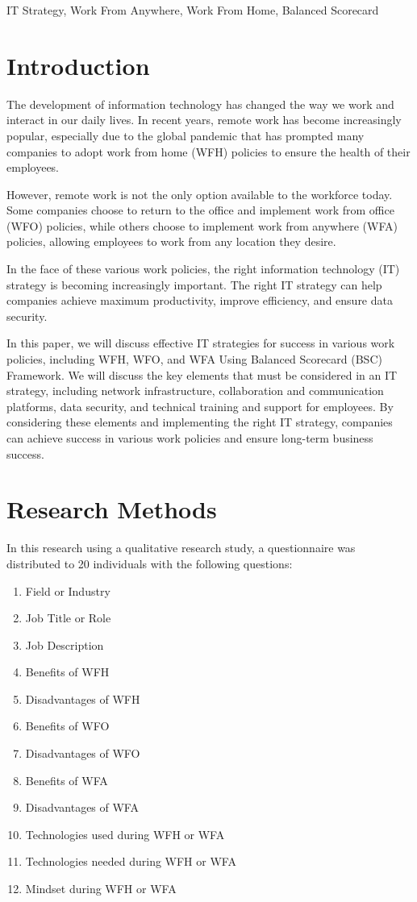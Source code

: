 \documentclass[conference]{IEEEtran}
\begin{document}
\begin{IEEEkeywords}
IT Strategy, Work From Anywhere, Work From Home, Balanced Scorecard
\end{IEEEkeywords}

\section{Introduction}
The development of information technology has changed the way we work and interact in our daily lives. In recent years, remote work has become increasingly popular, especially due to the global pandemic that has prompted many companies to adopt work from home (WFH) policies to ensure the health of their employees.

However, remote work is not the only option available to the workforce today. Some companies choose to return to the office and implement work from office (WFO) policies, while others choose to implement work from anywhere (WFA) policies, allowing employees to work from any location they desire.

In the face of these various work policies, the right information technology (IT) strategy is becoming increasingly important. The right IT strategy can help companies achieve maximum productivity, improve efficiency, and ensure data security.

In this paper, we will discuss effective IT strategies for success in various work policies, including WFH, WFO, and WFA Using Balanced Scorecard (BSC) Framework. We will discuss the key elements that must be considered in an IT strategy, including network infrastructure, collaboration and communication platforms, data security, and technical training and support for employees. By considering these elements and implementing the right IT strategy, companies can achieve success in various work policies and ensure long-term business success.

\section{Research Methods}

In this research using a qualitative research study, a questionnaire was distributed to 20 individuals with the following questions:
\begin{enumerate}
\item Field or Industry
\item Job Title or Role
\item Job Description
\item Benefits of WFH
\item Disadvantages of WFH
\item Benefits of WFO
\item Disadvantages of WFO
\item Benefits of WFA
\item Disadvantages of WFA
\item Technologies used during WFH or WFA
\item Technologies needed during WFH or WFA
\item Mindset during WFH or WFA
\end{enumerate}
\end{document}
